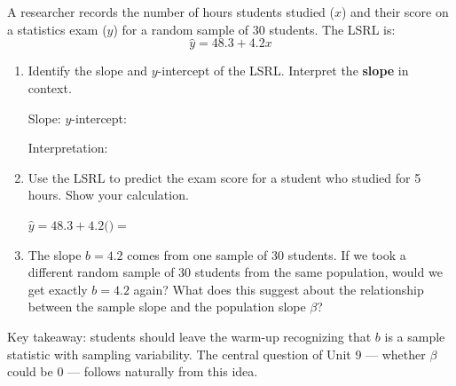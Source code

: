 \documentclass[10pt]{article}
\begin{document}
\namedateperiod

\vspace{0.15in}

A researcher records the number of hours students studied ($x$) and their score
on a statistics exam ($y$) for a random sample of 30 students. The LSRL is:
\[
    \hat{y} = 48.3 + 4.2x
\]

\begin{enumerate}

  \item Identify the slope and $y$-intercept of the LSRL. Interpret the
        \textbf{slope} in context.

        Slope:  \quad $y$-intercept: 

        \vspace{0.05in}
        Interpretation: 

        \vspace{0.1in}

  \item Use the LSRL to predict the exam score for a student who studied
        for 5 hours. Show your calculation.

        \vspace{0.05in}
        $\hat{y} = 48.3 + 4.2($$) = $ 

        \vspace{0.1in}

  \item The slope $b = 4.2$ comes from one sample of 30 students. If we took a
        different random sample of 30 students from the same population, would
        we get exactly $b = 4.2$ again? What does this suggest about the
        relationship between the sample slope and the population slope $\beta$?


\end{enumerate}

\begin{teachernote}
    Key takeaway: students should leave the warm-up recognizing that $b$ is a
    sample statistic with sampling variability. The central question of Unit 9 ---
    whether $\beta$ could be 0 --- follows naturally from this idea.
\end{teachernote}
\end{document}
